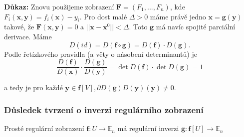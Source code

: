 \documentclass[../main.tex]{subfiles}
\begin{document}
\vspace{5mm}
\noindent
\textbf{Důkaz:} Znovu použijeme zobrazení $\textbf{F} = (F_1,...,F_n)$, kde $F_i(\textbf{x},\textbf{y}) = f_i(\textbf{x})-y_i$. Pro dost malé 
$\Delta > 0$ máme právě jedno $\textbf{x} = \textbf{g}(\textbf{y})$ takové, že $\textbf{F}(\textbf{x},\textbf{y}) = 0$ a $||\textbf{x} - \textbf{x}^0|| < \Delta$.
Toto $\textbf{g}$ má navíc spojité parciální derivace. Máme
\[D(id) = D(\textbf{f}\circ\textbf{g}) = D(\textbf{f})\cdot D(\textbf{g}).\]
Podle řetízkového pravidla (a věty o násobení determinantů) je 
\[\frac{D(\textbf{f})}{D(\textbf{x})}\cdot\frac{D(\textbf{g})}{D(\textbf{y})} = \det D(\textbf{f})\cdot \det D(\textbf{g}) = 1\]

a tedy je pro každé $\textbf{y} \in \textbf{f}[V], \partial{D(\textbf{g})}{D(\textbf{y})}(\textbf{y}) \neq 0$.

\subsubsection{Důsledek tvrzení o inverzi regulárního zobrazení}
\hspace{1.2mm}
\noindent
Prosté regulární zobrazení $\mathbf{f}: U \to \mathbb{E}_n$ má regulární inverzi
$\mathbf{g}: \mathbf{f}[U] \to \mathbb{E}_n$
\end{document}
